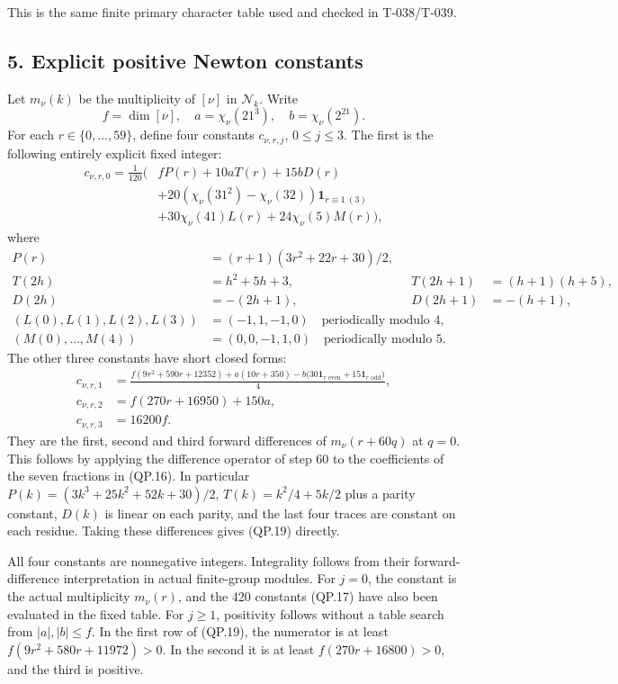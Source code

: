 \documentclass[
  10pt,
]{article}
\begin{document}
This is the same finite primary character table used and checked in
T-038/T-039.

\subsection{5. Explicit positive Newton
constants}\label{explicit-positive-newton-constants}

Let \(m_\nu(k)\) be the multiplicity of \([\nu]\) in \(\mathcal N_k\).
Write \[
f=\dim[\nu],\quad a=\chi_\nu(21^3),\quad
b=\chi_\nu(2^21).
\] For each \(r\in\{0,\ldots,59\}\), define four constants
\(c_{\nu,r,j}\), \(0\le j\le3\). The first is the following entirely
explicit fixed integer: \[
\begin{aligned}
c_{\nu,r,0}=\frac1{120}\bigl(&fP(r)+10aT(r)+15bD(r)\\
&+20(\chi_\nu(31^2)-\chi_\nu(32))\mathbf1_{r\equiv1\ (3)}\\
&+30\chi_\nu(41)L(r)+24\chi_\nu(5)M(r)\bigr),
\end{aligned}
\tag{QP.17}
\] where \[
\begin{aligned}
P(r)&=(r+1)(3r^2+22r+30)/2,\\
T(2h)&=h^2+5h+3,&T(2h+1)&=(h+1)(h+5),\\
D(2h)&=-(2h+1),&D(2h+1)&=-(h+1),\\
(L(0),L(1),L(2),L(3))&=(-1,1,-1,0)\quad\text{periodically modulo }4,\\
(M(0),\ldots,M(4))&=(0,0,-1,1,0)\quad\text{periodically modulo }5.
\end{aligned}
\tag{QP.18}
\] The other three constants have short closed forms: \[
\boxed{\begin{aligned}
c_{\nu,r,1}
&=\frac{f(9r^2+590r+12352)+a(10r+350)
      -b\bigl(30\mathbf1_{r\text{ even}}+15\mathbf1_{r\text{ odd}}\bigr)}4,\\
c_{\nu,r,2}&=f(270r+16950)+150a,\\
c_{\nu,r,3}&=16200f.
\end{aligned}}
\tag{QP.19}
\] They are the first, second and third forward differences of
\(m_\nu(r+60q)\) at \(q=0\). This follows by applying the difference
operator of step 60 to the coefficients of the seven fractions in
(QP.16). In particular \(P(k)=(3k^3+25k^2+52k+30)/2\),
\(T(k)=k^2/4+5k/2\) plus a parity constant, \(D(k)\) is linear on each
parity, and the last four traces are constant on each residue. Taking
these differences gives (QP.19) directly.

All four constants are nonnegative integers. Integrality follows from
their forward-difference interpretation in actual finite-group modules.
For \(j=0\), the constant is the actual multiplicity \(m_\nu(r)\), and
the 420 constants (QP.17) have also been evaluated in the fixed table.
For \(j\ge1\), positivity follows without a table search from
\(|a|,|b|\le f\). In the first row of (QP.19), the numerator is at least
\(f(9r^2+580r+11972)>0\). In the second it is at least
\(f(270r+16800)>0\), and the third is positive.
\end{document}

